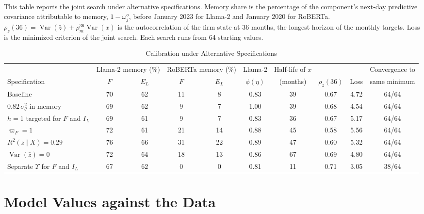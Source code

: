 \documentclass[11pt,letterpaper]{article}
\theoremstyle{remark}
\DeclareMathOperator{\Var}{Var}
\begin{document}
\begin{table}[htbp]
\centering
\caption{Calibration under Alternative Specifications}
\label{tab:D5}
\begin{minipage}{\linewidth}\footnotesize
This table reports the joint search under alternative specifications. Memory share is the percentage of the component's next-day predictive covariance attributable to memory, $1-\omega_j^o$, before January 2023 for Llama-2 and January 2020 for RoBERTa. $\rho_z(36)=\Var(\bar z)+\rho_m^{36}\Var(x)$ is the autocorrelation of the firm state at 36 months, the longest horizon of the monthly targets. Loss is the minimized criterion of the joint search. Each search runs from 64 starting values.
\end{minipage}
\medskip

{\footnotesize
\begin{adjustbox}{max width=\linewidth}
\begin{tabular}{lccccccccc}
\toprule
 & \multicolumn{2}{c}{Llama-2 memory (\%)} & \multicolumn{2}{c}{RoBERTa memory (\%)} & Llama-2 & Half-life of $x$ & & & Convergence to \\
\cmidrule(lr){2-3}\cmidrule(lr){4-5}
Specification & $F$ & $E_L$ & $F$ & $E_L$ & $\phi(\eta)$ & (months) & $\rho_z(36)$ & Loss & same minimum \\
\midrule
Baseline & 70 & 62 & 11 & 8 & 0.83 & 39 & 0.67 & 4.72 & 64/64 \\
$0.82\,\sigma_\theta^2$ in memory & 69 & 62 & 9 & 7 & 1.00 & 39 & 0.68 & 4.54 & 64/64 \\
$h=1$ targeted for $F$ and $I_L$ & 69 & 61 & 9 & 7 & 0.83 & 36 & 0.67 & 5.17 & 64/64 \\
$\varpi_F=1$ & 72 & 61 & 21 & 14 & 0.88 & 45 & 0.58 & 5.56 & 64/64 \\
$R^2(z\mid X)=0.29$ & 76 & 66 & 31 & 22 & 0.89 & 47 & 0.60 & 5.32 & 64/64 \\
$\Var(\bar z)=0$ & 72 & 64 & 18 & 13 & 0.86 & 67 & 0.69 & 4.80 & 64/64 \\
Separate $\Upsilon$ for $F$ and $I_L$ & 67 & 62 & 0 & 0 & 0.81 & 11 & 0.71 & 3.05 & 38/64 \\
\bottomrule
\end{tabular}
\end{adjustbox}
}
\end{table}

\section{Model Values against the Data}\label{sec:modeldata}
\end{document}

